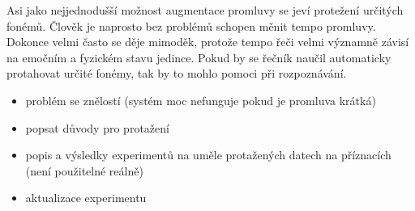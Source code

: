 Asi jako nejjednodušší možnost augmentace promluvy se jeví protežení určitých fonémů. Člověk je naprosto bez problémů schopen měnit tempo promluvy. Dokonce velmi často se děje mimoděk, protože tempo řeči velmi významně závisí na emočním a fyzickém stavu jedince. Pokud by se řečník naučil automaticky protahovat určité fonémy, tak by to mohlo pomoci při rozpoznávání.



\begin{itemize}
  \item problém se znělostí (systém moc nefunguje pokud je promluva krátká)
  \item popsat důvody pro protažení
  \item popis a výsledky experimentů na uměle protažených datech na příznacích (není použitelné reálně)
  \item aktualizace experimentu 
\end{itemize}
